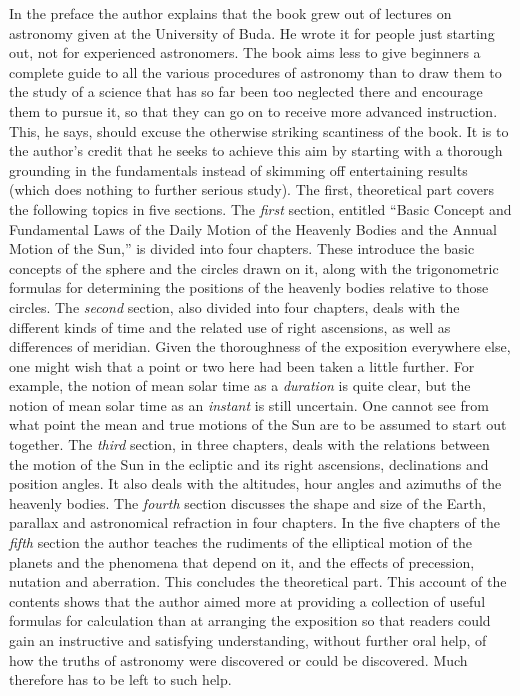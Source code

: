 In the preface the author explains that the book grew out of lectures on astronomy given at the University of Buda. He wrote it for people just starting out, not for experienced astronomers. The book aims less to give beginners a complete guide to all the various procedures of astronomy than to draw them to the study of a science that has so far been too neglected there and encourage them to pursue it, so that they can go on to receive more advanced instruction. This, he says, should excuse the otherwise striking scantiness of the book. It is to the author's credit that he seeks to achieve this aim by starting with a thorough grounding in the fundamentals instead of skimming off entertaining results (which does nothing to further serious study). The first, theoretical part covers the following topics in five sections. The \emph{first} section, entitled “Basic Concept and Fundamental Laws of the Daily Motion of the Heavenly Bodies and the Annual Motion of the Sun,” is divided into four chapters. These introduce the basic concepts of the sphere and the circles drawn on it, along with the trigonometric formulas for determining the positions of the heavenly bodies relative to those circles. The \emph{second} section, also divided into four chapters, deals with the different kinds of time and the related use of right ascensions, as well as differences of meridian. Given the thoroughness of the exposition everywhere else, one might wish that a point or two here had been taken a little further. For example, the notion of mean solar time as a \emph{duration} is quite clear, but the notion of mean solar time as an \emph{instant} is still uncertain. One cannot see from what point the mean and true motions of the Sun are to be assumed to start out together. The \emph{third} section, in three chapters, deals with the relations between the motion of the Sun in the ecliptic and its right ascensions, declinations and position angles. It also deals with the altitudes, hour angles and azimuths of the heavenly bodies. The \emph{fourth} section discusses the shape and size of the Earth, parallax and astronomical refraction in four chapters. In the five chapters of the \emph{fifth} section the author teaches the rudiments of the elliptical motion of the planets and the phenomena that depend on it, and the effects of precession, nutation and aberration. This concludes the theoretical part. This account of the contents shows that the author aimed more at providing a collection of useful formulas for calculation than at arranging the exposition so that readers could gain an instructive and satisfying understanding, without further oral help, of how the truths of astronomy were discovered or could be discovered. Much therefore has to be left to such help.

